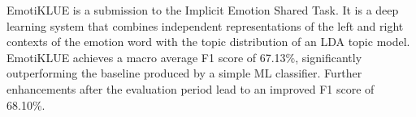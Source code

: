 EmotiKLUE is a submission to the Implicit Emotion Shared Task. It is a deep learning system that combines independent representations of the left and right contexts of the emotion word with the topic distribution of an LDA topic model. EmotiKLUE achieves a macro average F1 score of 67.13\%, significantly outperforming the baseline produced by a simple ML classifier. Further enhancements after the evaluation period lead to an improved F1 score of 68.10\%.
